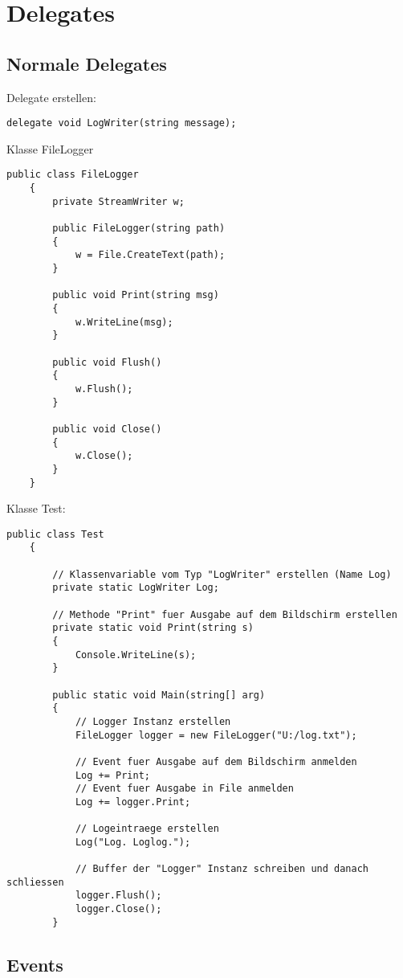 \newpage
\section{Delegates}
\subsection{Normale Delegates}
Delegate erstellen:
\begin{lstlisting}[style=Csharp]
	 delegate void LogWriter(string message);
\end{lstlisting}

Klasse FileLogger 
\begin{lstlisting}[style=Csharp]
    public class FileLogger
    {
        private StreamWriter w;

        public FileLogger(string path)
        {
            w = File.CreateText(path);
        }

        public void Print(string msg)
        {
            w.WriteLine(msg);
        }

        public void Flush()
        {
            w.Flush();
        }

        public void Close()
        {
            w.Close();
        }
    }
\end{lstlisting}

Klasse Test:
\begin{lstlisting}[style=Csharp]
	public class Test
	{

	    // Klassenvariable vom Typ "LogWriter" erstellen (Name Log)
	    private static LogWriter Log;
	
	    // Methode "Print" fuer Ausgabe auf dem Bildschirm erstellen
	    private static void Print(string s)
	    {
	        Console.WriteLine(s);
	    }
	
	    public static void Main(string[] arg)
	    {
	        // Logger Instanz erstellen
	        FileLogger logger = new FileLogger("U:/log.txt");
	
	        // Event fuer Ausgabe auf dem Bildschirm anmelden
	        Log += Print;
	        // Event fuer Ausgabe in File anmelden
	        Log += logger.Print; 
	
	        // Logeintraege erstellen
	        Log("Log. Loglog.");
	
	        // Buffer der "Logger" Instanz schreiben und danach schliessen
	        logger.Flush();
	        logger.Close();
	    }
 \end{lstlisting}
 
 \newpage
 \subsection{Events}
 
